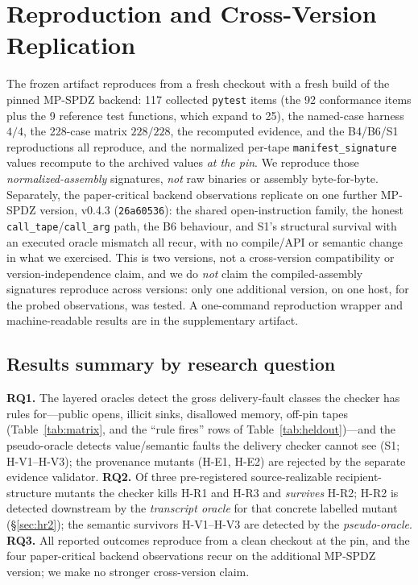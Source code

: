 \documentclass[conference]{IEEEtran}
\newcommand{\code}[1]{\texttt{\small #1}}
\newcommand{\calltape}{\code{call\_tape}}
\newcommand{\callarg}{\code{call\_arg}}
\begin{document}
\section{Reproduction and Cross-Version Replication}
\label{sec:repro}
The frozen artifact reproduces from a fresh checkout with a fresh build of the pinned
MP-SPDZ backend: 117 collected \code{pytest} items (the 92 conformance items plus the 9
reference test functions, which expand to 25), the named-case harness $4/4$, the 228-case
matrix $228/228$, the recomputed evidence, and the B4/B6/S1 reproductions all reproduce, and
the normalized per-tape \code{manifest\_signature} values recompute to the archived values
\emph{at the pin}. We reproduce those \emph{normalized-assembly} signatures, \emph{not} raw
binaries or assembly byte-for-byte. Separately, the paper-critical backend observations
replicate on one further MP-SPDZ version, v0.4.3 (\code{26a60536}): the shared
open-instruction family, the honest \calltape/\callarg{} path, the B6 behaviour, and S1's
structural survival with an executed oracle mismatch all recur, with no compile/API or
semantic change in what we exercised. This is two versions, not a cross-version
compatibility or version-independence claim, and we do \emph{not} claim the compiled-assembly
signatures reproduce across versions: only one additional version, on one host, for the
probed observations, was tested. A one-command reproduction wrapper and machine-readable
results are in the supplementary artifact.

\subsection{Results summary by research question}
\label{sec:rqsummary}
\textbf{RQ1.} The layered oracles detect the gross delivery-fault classes the checker has
rules for---public opens, illicit sinks, disallowed memory, off-pin tapes (Table~\ref{tab:matrix},
and the ``rule fires'' rows of Table~\ref{tab:heldout})---and the pseudo-oracle detects
value/semantic faults the delivery checker cannot see (S1; H-V1--H-V3); the provenance
mutants (H-E1, H-E2) are rejected by the separate evidence validator. \textbf{RQ2.} Of three
pre-registered source-realizable recipient-structure mutants the checker kills H-R1 and H-R3
and \emph{survives} H-R2; H-R2 is detected downstream by the \emph{transcript oracle} for
that concrete labelled mutant (\S\ref{sec:hr2}); the semantic survivors H-V1--H-V3 are
detected by the \emph{pseudo-oracle}. \textbf{RQ3.} All reported outcomes reproduce from a
clean checkout at the pin, and the four paper-critical backend observations recur on the
additional MP-SPDZ version; we make no stronger cross-version claim.
\end{document}
